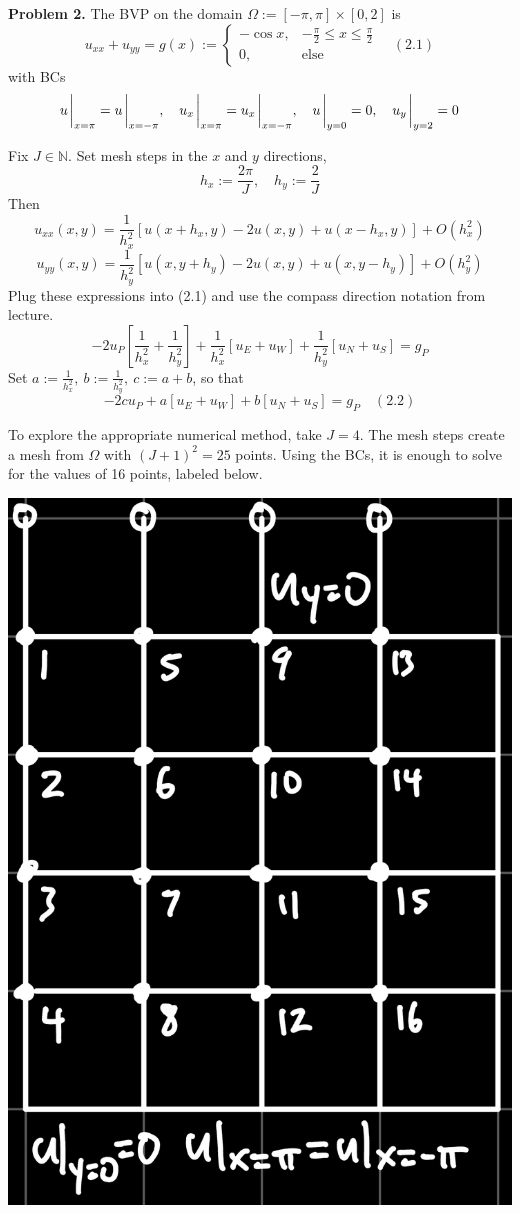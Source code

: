 \documentclass{article}
\def\mbb#1{\mathbb{#1}}
\def\tbf#1{\textbf{#1}}
\def\bN{\mbb{N}}
\newcommand{\sbr}[1]{\left[#1\right]}
\begin{document}
\tbf{Problem 2.} The BVP on the domain $\Omega:=[-\pi,\pi]\times[0,2]$ is
$$u_{xx} + u_{yy} = g(x) :=
\begin{cases}
	-\cos x, & -\frac\pi2 \le x \le \frac\pi2\\
	0, & \text{else}
\end{cases} \quad (2.1)$$
with BCs
$$u\eval_{x=\pi} = u\eval_{x=-\pi},
\quad u_x\eval_{x=\pi} = u_x\eval_{x=-\pi},
\quad u\eval_{y=0} = 0,
\quad u_y\eval_{y=2} = 0$$

Fix $J\in\bN$. Set mesh steps in the $x$ and $y$ directions,
$$h_x := \frac{2\pi}{J},
\quad h_y := \frac{2}{J}$$
Then
$$u_{xx}(x,y) = \frac{1}{h_x^2}\sbr{u(x+h_x,y) - 2u(x,y) + u(x-h_x,y)} + O(h_x^2)$$
$$u_{yy}(x,y) = \frac{1}{h_y^2}\sbr{u(x,y+h_y) - 2u(x,y) + u(x,y-h_y)} + O(h_y^2)$$
Plug these expressions into (2.1) and use the compass direction notation from lecture.
$$-2u_P\sbr{\frac{1}{h_x^2} + \frac{1}{h_y^2}} + \frac{1}{h_x^2}[u_E + u_W] + \frac{1}{h_y^2}[u_N + u_S] = g_P$$
Set $a:=\frac{1}{h_x^2},~b:=\frac{1}{h_y^2},~c:=a+b$, so that
$$-2cu_P + a[u_E + u_W] + b[u_N + u_S] = g_P \quad (2.2)$$

To explore the appropriate numerical method, take $J=4$. The mesh steps create a mesh from $\Omega$ with $(J+1)^2=25$ points. Using the BCs, it is enough to solve for the values of 16 points, labeled below.

\begin{center}
	\includegraphics[scale=.1]{hw6 2 grid}
\end{center}
\end{document}
